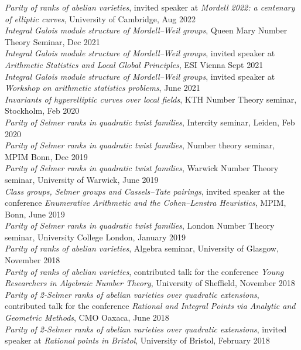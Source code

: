 \documentclass{res}
\begin{document}
\begin{resume}
\bigskip
\vspace{-0.1in}
{\it  Parity of ranks of abelian varieties}, invited speaker at {\it Mordell 2022: a centenary of elliptic curves}, University of Cambridge, Aug 2022    \medskip  \\
{\it  Integral Galois module structure of Mordell--Weil groups}, Queen Mary Number Theory Seminar, Dec 2021   \medskip  \\
{\it  Integral Galois module structure of Mordell--Weil groups}, invited speaker at {\it Arithmetic Statistics and Local Global Principles}, ESI Vienna Sept 2021    \medskip  \\
{\it  Integral Galois module structure of Mordell--Weil groups}, invited speaker at {\it Workshop on arithmetic statistics problems}, June 2021   \medskip  \\
{\it  Invariants of hyperelliptic curves over local fields}, KTH Number Theory seminar, Stockholm, Feb 2020  \vspace{-0.18in} \medskip  \\
{\it Parity of Selmer ranks in quadratic twist families}, Intercity seminar, Leiden, Feb 2020 \medskip \\
{\it Parity of Selmer ranks in quadratic twist families}, Number theory seminar, MPIM Bonn, Dec 2019 \medskip \\
{\it Parity of Selmer ranks in quadratic twist families}, Warwick Number Theory seminar, University of Warwick, June 2019 \medskip \\
{\it Class groups, Selmer groups and Cassels--Tate pairings}, invited speaker at the conference {\it Enumerative Arithmetic and the Cohen–Lenstra Heuristics}, MPIM, Bonn, June 2019 \medskip \\
{\it Parity of Selmer ranks in quadratic twist families}, London Number Theory seminar, University College London, January 2019  \medskip \\
{\it Parity of ranks of abelian varieties}, Algebra seminar, University of Glasgow, November 2018  \medskip \\
{\it Parity of ranks of abelian varieties},  contributed talk for the conference {\it Young Researchers in Algebraic Number Theory}, University of Sheffield, November 2018  \medskip \\
{\it Parity of 2-Selmer ranks of abelian varieties over quadratic extensions},  contributed talk for the conference {\it Rational and Integral Points via Analytic and Geometric Methods}, CMO Oaxaca, June 2018  \medskip \\
{\it Parity of 2-Selmer ranks of abelian varieties over quadratic extensions}, invited speaker at {\it Rational points in Bristol}, University of Bristol, February 2018  \medskip \\

\end{resume}
\end{document}
